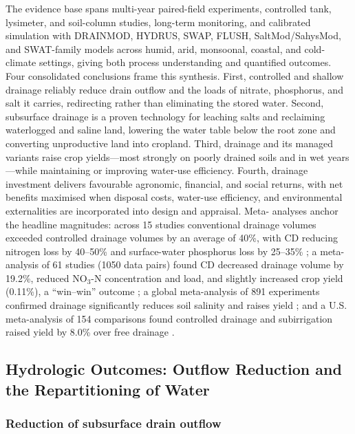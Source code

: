 The evidence base spans multi-year paired-field experiments, controlled tank,
lysimeter, and soil-column studies, long-term monitoring, and calibrated
simulation with DRAINMOD, HYDRUS, SWAP, FLUSH, SaltMod/SahysMod, and
SWAT-family models across humid, arid, monsoonal, coastal, and cold-climate
settings, giving both process understanding and quantified outcomes. Four
consolidated conclusions frame this synthesis. First, controlled and shallow
drainage reliably reduce drain outflow and the loads of nitrate, phosphorus, and
salt it carries, redirecting rather than eliminating the stored water. Second,
subsurface drainage is a proven technology for leaching salts and reclaiming
waterlogged and saline land, lowering the water table below the root zone and
converting unproductive land into cropland. Third, drainage and its managed
variants raise crop yields---most strongly on poorly drained soils and in wet
years---while maintaining or improving water-use efficiency. Fourth, drainage
investment delivers favourable agronomic, financial, and social returns, with
net benefits maximised when disposal costs, water-use efficiency, and
environmental externalities are incorporated into design and appraisal. Meta-
analyses anchor the headline magnitudes: across 15 studies conventional drainage
volumes exceeded controlled drainage volumes by an average of 40\%, with CD
reducing nitrogen loss by 40--50\% and surface-water phosphorus loss by 25--35\%
\parencite{Strock2011}; a meta-analysis of 61 studies (1050 data pairs) found CD
decreased drainage volume by 19.2\%, reduced NO$_3$-N concentration and load,
and slightly increased crop yield (0.11\%), a ``win--win'' outcome
\parencite{Wang2020c}; a global meta-analysis of 891 experiments confirmed
drainage significantly reduces soil salinity and raises yield
\parencite{Yang2025}; and a U.S. meta-analysis of 154 comparisons found
controlled drainage and subirrigation raised yield by 8.0\% over free drainage
\parencite{Singh2022b}.

\subsection{Hydrologic Outcomes: Outflow Reduction and the Repartitioning of Water}

\subsubsection{Reduction of subsurface drain outflow}

